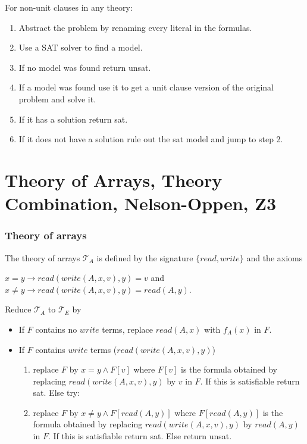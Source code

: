 \documentclass[]{article}
\begin{document}
For non-unit clauses in any theory:
\begin{enumerate}
	\item Abstract the problem by renaming every literal in the formulas.
	\item Use a SAT solver to find a model.
	\item If no model was found return unsat.
	\item If a model was found use it to get a unit clause version of the original problem and solve it.
	\item If it has a solution return sat.
	\item If it does not have a solution rule out the sat model and jump to step 2.
\end{enumerate}

\section{Theory of Arrays, Theory Combination, Nelson-Oppen, Z3}

\subsubsection{Theory of arrays}

The theory of arrays $\mathcal{T}_A$ is defined by the signature $\{read, write\}$ and the axioms 

$x = y \rightarrow read(write(A,x,v),y)=v$ and $x\not= y \rightarrow read(write(A,x,v),y)=read(A,y)$.

Reduce $\mathcal{T}_A$ to $\mathcal{T}_E$ by
\begin{itemize}
	\item If $F$ contains no $write$ terms, replace $read(A,x)$ with $f_A(x)$ in $F$.
	\item If $F$ contains $write$ terms ($read(write(A,x,v),y)$)
	\begin{enumerate}
		\item replace $F$ by $x=y \land F[v]$ where $F[v]$ is the formula obtained by replacing $read(write(A,x,v),y)$ by $v$ in $F$. If this is satisfiable return sat. Else try:
		\item replace $F$ by $x\not= y \land F[read(A,y)]$ where $F[read(A,y)]$ is the formula obtained by replacing $read(write(A,x,v),y)$ by $read(A,y)$ in $F$. If this is satisfiable return sat. Else return unsat.
	\end{enumerate}
\end{itemize}
\end{document}
